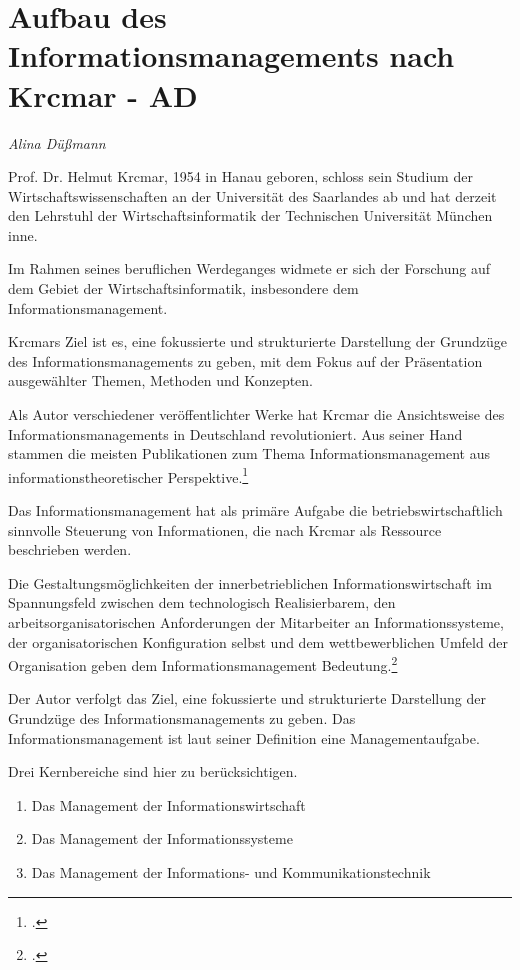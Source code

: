 \section{Aufbau des Informationsmanagements nach Krcmar - AD}
\label{section_aufbau_des_informationsmanagements_nach_krcmar}
\textit{Alina Düßmann}


Prof. Dr. Helmut Krcmar, 1954 in Hanau geboren, schloss sein Studium der Wirtschaftswissenschaften an der Universität des Saarlandes ab und hat derzeit den Lehrstuhl der Wirtschaftsinformatik der Technischen Universität München inne.

Im Rahmen seines beruflichen Werdeganges widmete er sich der Forschung  auf dem Gebiet der Wirtschaftsinformatik, insbesondere dem Informationsmanagement.

Krcmars Ziel ist es, eine fokussierte und strukturierte Darstellung der Grundzüge des Informationsmanagements zu geben, mit dem Fokus auf der Präsentation ausgewählter Themen, Methoden und Konzepten.

Als Autor verschiedener veröffentlichter Werke hat Krcmar die Ansichtsweise des
Informationsmanagements in Deutschland revolutioniert. Aus seiner Hand stammen die
meisten Publikationen zum Thema Informationsmanagement aus informationstheoretischer
Perspektive.\footcite{marsch_krcmar_2015}

Das Informationsmanagement hat als primäre Aufgabe die betriebswirtschaftlich sinnvolle Steuerung von Informationen, die nach Krcmar als Ressource beschrieben werden.

Die Gestaltungsmöglichkeiten der innerbetrieblichen Informationswirtschaft im Spannungsfeld zwischen dem technologisch Realisierbarem, den arbeitsorganisatorischen Anforderungen der Mitarbeiter an Informationssysteme, der organisatorischen Konfiguration selbst und dem wettbewerblichen Umfeld der Organisation geben dem Informationsmanagement Bedeutung.\footcite{fortiss_krcmar_2015}

Der Autor verfolgt das Ziel, eine fokussierte und strukturierte Darstellung der Grundzüge des Informationsmanagements zu geben. Das Informationsmanagement ist laut seiner Definition eine Managementaufgabe.

Drei Kernbereiche sind hier zu berücksichtigen.
\begin{enumerate}
	\item Das Management der Informationswirtschaft
	\item Das Management der Informationssysteme
	\item Das Management der Informations- und Kommunikationstechnik
\end{enumerate}

